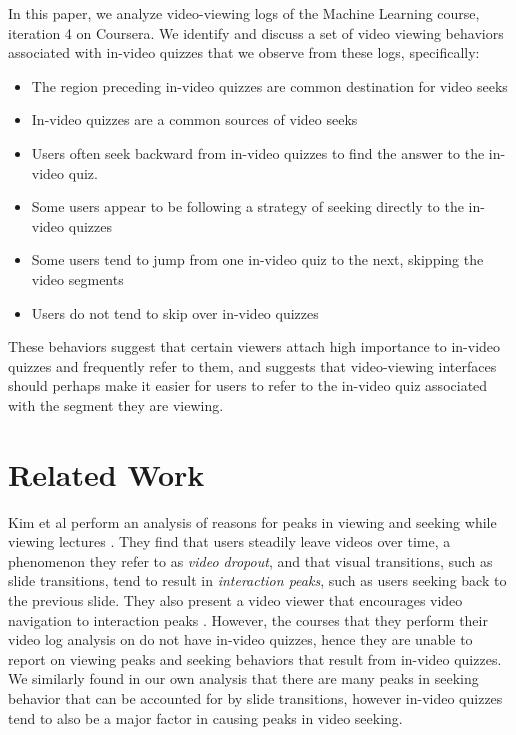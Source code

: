 \documentclass{sigchi}
\begin{document}
In this paper, we analyze video-viewing logs of the Machine Learning course, iteration 4 on Coursera. We identify and discuss a set of video viewing behaviors associated with in-video quizzes that we observe from these logs, specifically:

\begin{itemize}
\item The region preceding in-video quizzes are common destination for video seeks
\item In-video quizzes are a common sources of video seeks
\item Users often seek backward from in-video quizzes to find the answer to the in-video quiz.
\item Some users appear to be following a strategy of seeking directly to the in-video quizzes
\item Some users tend to jump from one in-video quiz to the next, skipping the video segments
\item Users do not tend to skip over in-video quizzes
\end{itemize}

These behaviors suggest that certain viewers attach high importance to in-video quizzes and frequently refer to them, and suggests that video-viewing interfaces should perhaps make it easier for users to refer to the in-video quiz associated with the segment they are viewing.

\newpage

\section{Related Work}

Kim et al perform an analysis of reasons for peaks in viewing and seeking while viewing lectures \cite{juho}. They find that users steadily leave videos over time, a phenomenon they refer to as \emph{video dropout}, and that visual transitions, such as slide transitions, tend to result in \emph{interaction peaks}, such as users seeking back to the previous slide. They also present a video viewer that encourages video navigation to interaction peaks  \cite{juho2}. However, the courses that they perform their video log analysis on do not have in-video quizzes, hence they are unable to report on viewing peaks and seeking behaviors that result from in-video quizzes. We similarly found in our own analysis that there are many peaks in seeking behavior that can be accounted for by slide transitions, however in-video quizzes tend to also be a major factor in causing peaks in video seeking.
\end{document}
